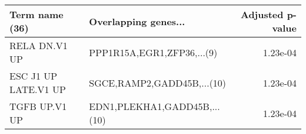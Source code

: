 \begin{tabular}{llr}
\toprule
      Term name (36) &         Overlapping genes... &  Adjusted p-value \\
\midrule
       RELA DN.V1 UP &   PPP1R15A,EGR1,ZFP36,...(9) &          1.23e-04 \\
ESC J1 UP LATE.V1 UP &   SGCE,RAMP2,GADD45B,...(10) &          1.23e-04 \\
       TGFB UP.V1 UP & EDN1,PLEKHA1,GADD45B,...(10) &          1.23e-04 \\
\bottomrule
\end{tabular}
